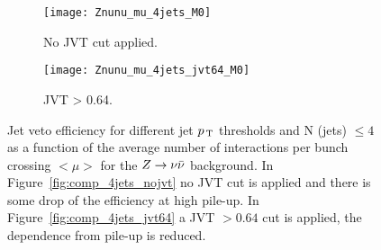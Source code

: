 \begin{figure}[!h]
  \centering
  \begin{subfigure}[t]{.48\linewidth}
    \texttt{[image: Znunu\_mu\_4jets\_M0]}
    \caption{No JVT cut applied.}
    \label{fig:znunu_4jets_jvt64}
  \end{subfigure}
  \begin{subfigure}[t]{.48\linewidth}
    \texttt{[image: Znunu\_mu\_4jets\_jvt64\_M0]}
    \caption{JVT > 0.64.}
    \label{fig:comp_4jets_jvt64_1}
  \end{subfigure}
  \caption{Jet veto efficiency for different jet $p_\mathrm{\, T}$ thresholds and N (jets)
    $\leq 4$ as a function of the average number of interactions per bunch
    crossing $<\mu>$ for the $Z \rightarrow \nu \bar{\nu}$ background. In
    Figure~\ref{fig:comp_4jets_nojvt} no JVT cut is applied and there is some
    drop of the efficiency at high pile-up. In Figure~\ref{fig:comp_4jets_jvt64}
    a JVT $> 0.64$ cut is applied, the dependence from pile-up is reduced.}
  \label{fig:jet_veto_comparison}
\end{figure}

